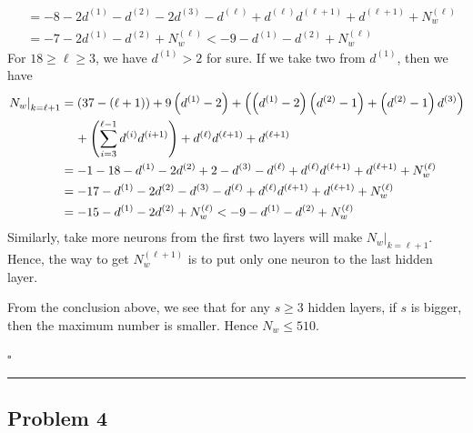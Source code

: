 \documentclass[12pt]{article}
\newcommand*{\QEDB}{\hfill\ensuremath{\square}}
\newcommand{\ParTh}[1]{\left(#1\right)}
\newcommand{\horrule}[1]{\rule{\linewidth}{#1}}
\begin{document}
\begin{enumerate}
\begin{align}
	&=-8-2d^{\ParTh{1}}-d^{\ParTh{2}}-2d^{\ParTh{3}}-d^{\ParTh{\ell}}+d^{\ParTh{\ell}}d^{\ParTh{\ell+1}}+d^{\ParTh{\ell+1}}+N^{\ParTh{\ell}}_w\\
	\label{3-1}
	&=-7-2d^{\ParTh{1}}-d^{\ParTh{2}}+N^{\ParTh{\ell}}_w<-9-d^{\ParTh{1}}-d^{\ParTh{2}}+N^{\ParTh{\ell}}_w
	\end{align}
	For $18\geq\ell\geq3$, we have $d^{\ParTh{1}}>2$ for sure. If we take two from $d^{\ParTh{1}}$, then we have
	\begin{align}
	\nonumber
	\left.N_w\right|_{k=\ell+1}&=\ParTh{37-\ParTh{\ell+1}}+9\ParTh{d^{\ParTh{1}}-2}+\ParTh{\ParTh{d^{\ParTh{1}}-2}\ParTh{d^{\ParTh{2}}-1}+\ParTh{d^{\ParTh{2}}-1}d^{\ParTh{3}}}\\
	&\hspace{4mm}+\ParTh{\sum_{i=3}^{\ell-1}d^{\ParTh{i}}d^{\ParTh{i+1}}}+d^{\ParTh{\ell}}d^{\ParTh{\ell+1}}+d^{\ParTh{\ell+1}}\\
	&=-1-18-d^{\ParTh{1}}-2d^{\ParTh{2}}+2-d^{\ParTh{3}}-d^{\ParTh{\ell}}+d^{\ParTh{\ell}}d^{\ParTh{\ell+1}}+d^{\ParTh{\ell+1}}+N^{\ParTh{\ell}}_w\\
	&=-17-d^{\ParTh{1}}-2d^{\ParTh{2}}-d^{\ParTh{3}}-d^{\ParTh{\ell}}+d^{\ParTh{\ell}}d^{\ParTh{\ell+1}}+d^{\ParTh{\ell+1}}+N^{\ParTh{\ell}}_w\\
	\label{3-1}
	&=-15-d^{\ParTh{1}}-2d^{\ParTh{2}}+N^{\ParTh{\ell}}_w<-9-d^{\ParTh{1}}-d^{\ParTh{2}}+N^{\ParTh{\ell}}_w
	\end{align}
	Similarly, take more neurons from the first two layers will make $\left.N_w\right|_{k=\ell+1}$. Hence, the way to get $N^{\ParTh{\ell+1}}_w$ is to put only one neuron to the last hidden layer.
\end{enumerate}
From the conclusion above, we see that for any $s\geq3$ hidden layers, if $s$ is bigger, then the maximum number is smaller. Hence $N_w\leq510$.

\QEDB

\horrule{0.5pt}

\subsection*{Problem 4}
\end{document}
